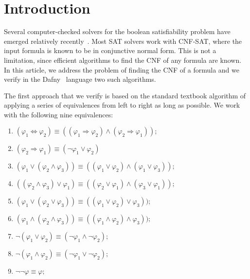 \chapter*{Introduction} 



Several computer-checked solvers for the boolean satisfiability
problem have emerged relatively
recently~\cite{DBLP:journals/jar/Maric09,DBLP:conf/vmcai/OeSOC12,DBLP:journals/jar/BlanchetteFLW18,DBLP:conf/nfm/Fleury19}. Most
SAT solvers work with CNF-SAT, where the input formula is known to be
in conjunctive normal form. This is not a limitation, since efficient
algorithms to find the CNF of any formula are known. In this article,
we address the problem of finding the CNF of a formula and we verify
in the Dafny~\cite{DBLP:conf/icse/Leino04} language two such algorithms.

The first approach that we verify is based on the standard textbook
algorithm of applying a series of equivalences from left to right as
long as possible. We work with the following nine equivalences:

\begin{enumerate}
    \item $( \varphi_1 \Leftrightarrow \varphi_2) \equiv ((\varphi_1 \Rightarrow \varphi_2) \land (\varphi_2 \Rightarrow \varphi_1));$
    \item $(\varphi_2 \Rightarrow \varphi_1) \equiv (\neg \varphi_1 \lor \varphi_2)$
    \item $(\varphi_1 \lor (\varphi_2 \land \varphi_3)) \equiv ((\varphi_1 \lor \varphi_2) \land (\varphi_1 \lor \varphi_3));$
    \item $((\varphi_2 \land \varphi_3) \lor \varphi_1) \equiv ((\varphi_2 \lor \varphi_1) \land (\varphi_3 \lor \varphi_1));$
    \item $(\varphi_1 \lor (\varphi_2 \lor \varphi_3)) \equiv ((\varphi_1 \lor \varphi_2) \lor \varphi_3));$
    \item $(\varphi_1 \land (\varphi_2 \land \varphi_3)) \equiv ((\varphi_1 \land \varphi_2) \land \varphi_3));$
    \item $\neg (\varphi_1 \lor \varphi_2) \equiv (\neg \varphi_1 \land \neg \varphi_2);$
    \item $\neg (\varphi_1 \land \varphi_2) \equiv (\neg \varphi_1 \lor \neg \varphi_2);$
    \item $\neg \neg \varphi \equiv \varphi;$
\end{enumerate}


